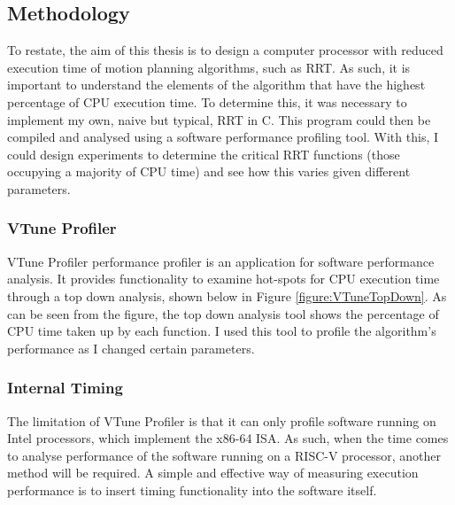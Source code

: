 

\subsection{Methodology}
    To restate, the aim of this thesis is to design a computer processor with reduced execution time of motion planning algorithms, such as \ac{RRT}. As such, it is important to understand the elements of the algorithm that have the highest percentage of CPU execution time. To determine this, it was necessary to implement my own, naive but typical, \ac{RRT} in C. This program could then be compiled and analysed using a software performance profiling tool. With this, I could design experiments to determine the critical RRT functions (those occupying a majority of CPU time) and see how this varies given different parameters.

    \subsubsection{VTune Profiler}
    \label{subsubsection:vtune}
        VTune Profiler performance profiler is an application for software performance analysis. It provides functionality to examine hot-spots for CPU execution time through a top down analysis, shown below in Figure \ref{figure:VTuneTopDown}. As can be seen from the figure, the top down analysis tool shows the percentage of CPU time taken up by each function. I used this tool to profile the algorithm's performance as I changed certain parameters.
        

    \subsubsection{Internal Timing}
        The limitation of VTune Profiler is that it can only profile software running on Intel processors, which implement the x86-64 \ac{ISA}. As such, when the time comes to analyse performance of the software running on a RISC-V processor, another method will be required. A simple and effective way of measuring execution performance is to insert timing functionality into the software itself. \\

